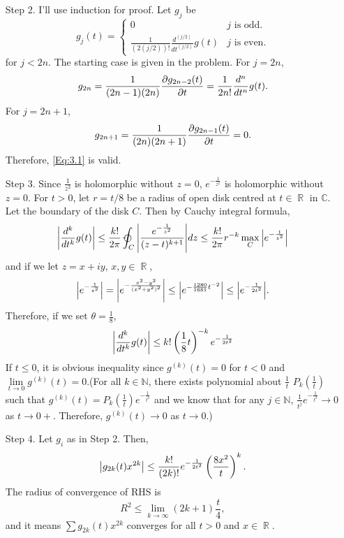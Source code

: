 \documentclass{article}
\DeclareMathOperator{\rr}{\mathbb{R}}
\begin{document}
\begin{enumerate}
\item[Step 2.] I'll use induction for proof. Let $g_j$ be
\begin{equation}\label{Eq:3.1}
g_j(t)=\begin{cases}
0 & j\text{ is odd.} \\
\frac{1}{(2(j/2))!}\frac{d^{(j/2)}}{dt^{(j/2)}}g(t) & j\text{ is even.}
\end{cases}
\end{equation}
for $j<2n$. The starting case is given in the problem. For $j=2n$,
\begin{equation*}
g_{2n}=\frac{1}{(2n-1)(2n)}\pdv{g_{2n-2}(t)}{t}=\frac{1}{2n!}\frac{d^{n}}{dt^{n}}g(t).
\end{equation*}
For $j=2n+1$,
\begin{equation*}
g_{2n+1}=\frac{1}{(2n)(2n+1)}\pdv{g_{2n-1}(t)}{t}=0.
\end{equation*}
Therefore, \eqref{Eq:3.1} is valid.
\item[Step 3.] Since $\frac{1}{z^2}$ is holomorphic without $z= 0$, $e^{-\frac{1}{z^2}}$ is holomorphic without $z=0$.
For $t> 0$, let $r=t/8$ be a radius of open disk centred at $t\in \rr$ in $\mathbb{C}$. Let the boundary of the disk $C$. Then by Cauchy integral formula,
\begin{equation*}
\abs{\frac{d^k}{dt^k}g(t)}\leq \frac{k!}{2\pi}\varointctrclockwise_C \abs{\frac{e^{-\frac{1}{z^2}}}{(z-t)^{k+1}}}dz\leq \frac{k!}{2\pi} r^{-k} \max\limits_C\abs{e^{-\frac{1}{z^2}}}
\end{equation*}
and if we let $z=x+iy$, $x,y\in \rr$,
\begin{equation*}
\abs{e^{-\frac{1}{z^2}}}=\abs{e^{-\frac{x^2-y^2}{(x^2+y^2)^2}}}\leq \abs{e^{-\frac{1280}{1681}t^{-2}}}\leq\abs{e^{-\frac{1}{2t^2}}}.
\end{equation*}
Therefore, if we set $\theta=\frac{1}{8}$,
\begin{equation*}
\abs{\frac{d^k}{dt^k}g(t)}\leq k!\left(\frac{1}{8}t\right)^{-k}e^{-\frac{1}{2t^2}}
\end{equation*}
If $t\leq 0$, it is obvious inequality since $g^{(k)}(t)=0$ for $t<0$ and $\lim\limits_{t\rightarrow 0} g^{(k)}(t)=0$.(For all $k\in \mathbb{N}$, there exists polynomial about $\frac{1}{t}$ $P_k\left(\frac{1}{t}\right)$ such that $g^{(k)}(t)=P_k\left(\frac{1}{t}\right)e^{-\frac{1}{t^2}}$ and we know that for any $j\in\mathbb{N}$, $\frac{1}{t^j}e^{-\frac{1}{t^2}}\rightarrow 0$ as $t\rightarrow 0+$. Therefore, $g^{(k)}(t)\rightarrow 0$ as $t\rightarrow 0$.)
\item[Step 4.] Let $g_i$ as in Step 2. Then,
\begin{equation*}
\abs{g_{2k}(t)x^{2k}}\leq \frac{k!}{(2k)!}e^{-\frac{1}{2t^2}}\left(\frac{8x^2}{t}\right)^k.
\end{equation*}
The radius of convergence of RHS is
\begin{equation*}
R^2\leq \lim\limits_{k\rightarrow \infty}(2k+1)\frac{t}{4},
\end{equation*}
and it means $\sum g_{2k}(t)x^{2k}$ converges for all $t>0$ and $x\in \rr$.


\end{enumerate}
\end{document}
